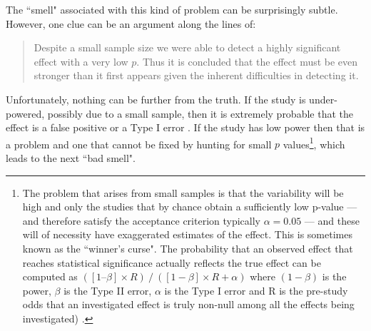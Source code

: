 \documentclass[10pt]{elsarticle}
\newcommand{\RED}{\color{black}}
\newcommand{\BLACK}{\color{black}}
\begin{document}

\noindent
The ``smell" associated with this kind of problem can be surprisingly subtle.  However, one clue can be an argument along the lines of:
\begin{quote}
    Despite a small sample size we were able to detect a highly significant effect with a very low $p$. Thus it is concluded that the effect must be even stronger than it first appears given the inherent difficulties in detecting it.
\end{quote}

\noindent
Unfortunately, nothing can be further from the truth.  If the study is under-powered, possibly due to a small sample, then it is extremely probable that the effect is a false positive or a Type I error \cite{Loke17}.  If the study has low power then that is a problem and one that cannot be fixed by hunting for small $p$ values\footnote{\RED The problem that arises from small samples is that the variability will be high and only the studies that by chance obtain a sufficiently low p-value --- and therefore satisfy the acceptance criterion typically $\alpha=0.05$ --- and these will of necessity have exaggerated estimates of the effect. This is sometimes known as the ``winner's curse".  The probability that an observed effect that reaches statistical significance actually reflects the true effect can be computed as $([1 – \beta] \times R) ⁄ ([1− \beta] \times R + \alpha)$ where $(1−\beta)$ is the power, $\beta$ is the Type II error, $\alpha$ is the Type I error and R is the pre-study odds that an investigated effect is truly non-null among all the effects being investigated) \cite{Loke17,Szuc17}. \BLACK }, which leads to the next ``bad smell".
\end{document}
